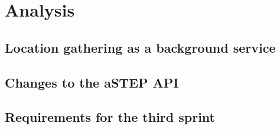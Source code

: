 \section{Analysis}

\subsection{Location gathering as a background service}

\subsection{Changes to the aSTEP API}


\subsection{Requirements for the third sprint}

